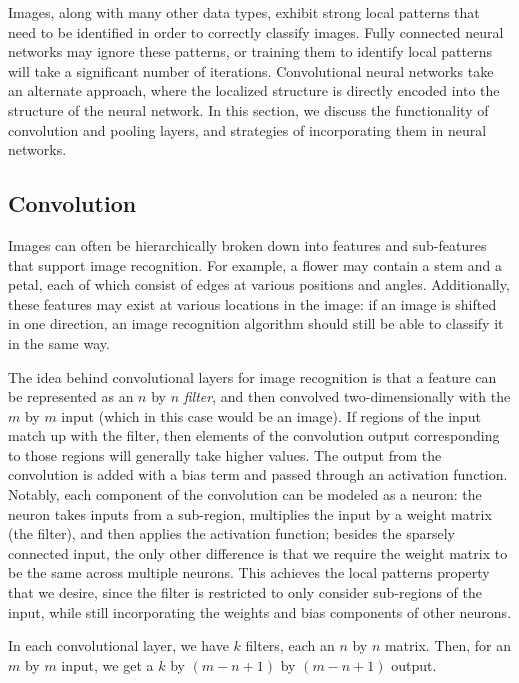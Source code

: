 \documentclass[10pt,twocolumn]{article}
\begin{document}
Images, along with many other data types, exhibit strong local patterns that need to be identified in order to correctly classify images. Fully connected neural networks may ignore these patterns, or training them to identify local patterns will take a significant number of iterations. Convolutional neural networks take an alternate approach, where the localized structure is directly encoded into the structure of the neural network. In this section, we discuss the functionality of convolution and pooling layers, and strategies of incorporating them in neural networks.

\subsection{Convolution}

Images can often be hierarchically broken down into features and sub-features that support image recognition. For example, a flower may contain a stem and a petal, each of which consist of edges at various positions and angles. Additionally, these features may exist at various locations in the image: if an image is shifted in one direction, an image recognition algorithm should still be able to classify it in the same way.

The idea behind convolutional layers for image recognition is that a feature can be represented as an $n$ by $n$ \emph{filter}, and then convolved two-dimensionally with the $m$ by $m$ input (which in this case would be an image). If regions of the input match up with the filter, then elements of the convolution output corresponding to those regions will generally take higher values. The output from the convolution is added with a bias term and passed through an activation function. Notably, each component of the convolution can be modeled as a neuron: the neuron takes inputs from a sub-region, multiplies the input by a weight matrix (the filter), and then applies the activation function; besides the sparsely connected input, the only other difference is that we require the weight matrix to be the same across multiple neurons. This achieves the local patterns property that we desire, since the filter is restricted to only consider sub-regions of the input, while still incorporating the weights and bias components of other neurons.

In each convolutional layer, we have $k$ filters, each an $n$ by $n$ matrix. Then, for an $m$ by $m$ input, we get a $k$ by $(m - n + 1)$ by $(m - n + 1)$ output.
\end{document}
